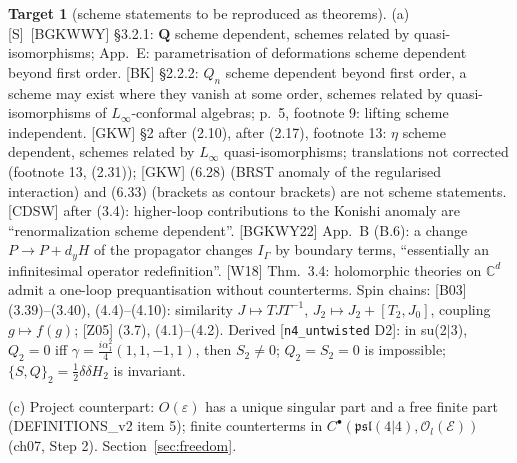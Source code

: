 \documentclass[11pt]{article}
\theoremstyle{definition}
\newtheorem{target}{Target}
\newcommand{\Sl}{\textup{[S]}}
\begin{document}
\begin{target}[scheme statements to be reproduced as theorems]\label{t:scheme}
(a) \Sl\ [BGKWWY] \S3.2.1: $\mathbf Q$ scheme dependent, schemes related by quasi-isomorphisms; App.~E: parametrisation of deformations scheme dependent beyond first order. [BK] \S2.2.2: $Q_n$ scheme dependent beyond first order, a scheme may exist where they vanish at some order, schemes related by quasi-isomorphisms of $L_\infty$-conformal algebras; p.~5, footnote 9: lifting scheme independent. [GKW] \S2 after (2.10), after (2.17), footnote 13: $\eta$ scheme dependent, schemes related by $L_\infty$ quasi-isomorphisms; translations not corrected (footnote 13, (2.31)); [GKW] (6.28) (BRST anomaly of the regularised interaction) and (6.33) (brackets as contour brackets) are not scheme statements. [CDSW] after (3.4): higher-loop contributions to the Konishi anomaly are ``renormalization scheme dependent''. [BGKWY22] App.~B (B.6): a change $P\to P+d_yH$ of the propagator changes $I_\Gamma$ by boundary terms, ``essentially an infinitesimal operator redefinition''. [W18] Thm.~3.4: holomorphic theories on $\mathbb C^d$ admit a one-loop prequantisation without counterterms. Spin chains: [B03] (3.39)--(3.40), (4.4)--(4.10): similarity $J\mapsto TJT^{-1}$, $J_2\mapsto J_2+[T_2,J_0]$, coupling $g\mapsto f(g)$; [Z05] (3.7), (4.1)--(4.2). Derived [\texttt{n4\_untwisted} D2]: in su(2$|$3), $Q_2=0$ iff $\gamma=\frac{i\alpha_1^2}4(1,1,-1,1)$, then $S_2\neq0$; $Q_2=S_2=0$ is impossible; $\{S,Q\}_2=\frac12\delta\delta H_2$ is invariant.

(c) Project counterpart: $O(\varepsilon)$ has a unique singular part and a free finite part (DEFINITIONS\_v2 item 5); finite counterterms in $C^\bullet(\mathfrak{psl}(4|4),\mathscr O_l(\mathscr E))$ (ch07, Step 2). Section~\ref{sec:freedom}.
\end{target}
\end{document}
